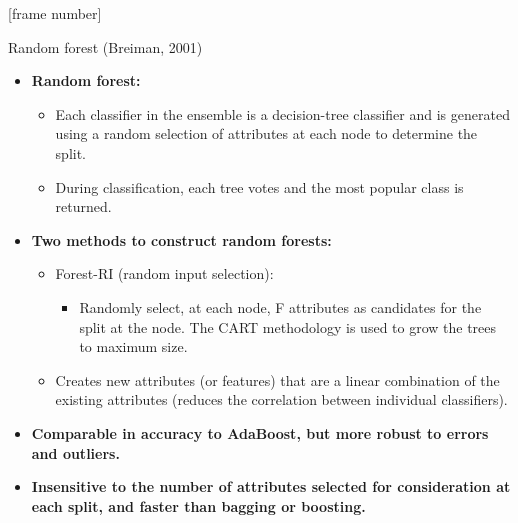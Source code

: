 \documentclass[aspectratio=169,t,table]{beamer}
\begin{document}
  {
    [frame number]
    \begin{frame}{Random forest (Breiman, 2001)}
      \begin{itemize}
        \item \textbf{Random forest:}
        \begin{itemize}
          \item Each classifier in the ensemble is a decision-tree classifier and is generated using a random selection of attributes at each node to determine the split.
          \item During classification, each tree votes and the most popular class is returned.
        \end{itemize}
        \item \textbf{Two methods to construct random forests:}
        \begin{itemize}
          \item Forest-RI (random input selection):
          \begin{itemize}
            \item Randomly select, at each node, F attributes as candidates for the split at the node. The CART methodology is used to grow the trees to maximum size.
          \end{itemize}
          \item Creates new attributes (or features) that are a linear combination of the existing attributes (reduces the correlation between individual classifiers).
        \end{itemize}
        \item \textbf{Comparable in accuracy to AdaBoost, but more robust to errors and outliers.}
        \item \textbf{Insensitive to the number of attributes selected for consideration at each split, and faster than bagging or boosting.}
      \end{itemize}
    \end{frame}
  }
\end{document}

